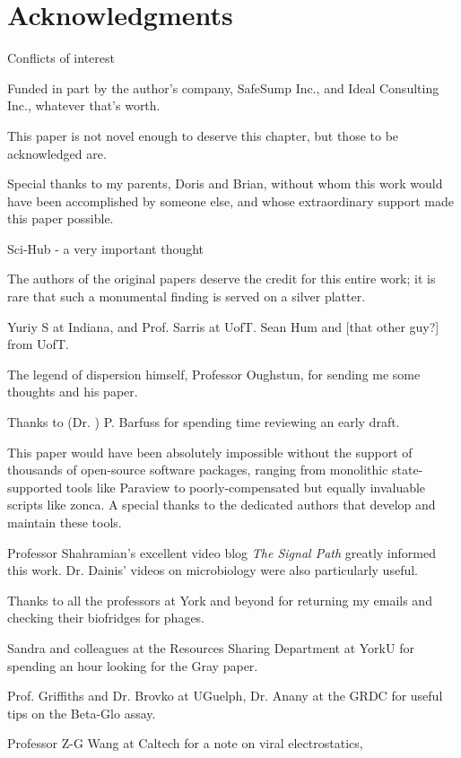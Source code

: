 \documentclass[paper.tex]{subfiles}
\begin{document}
	
\clearpage
\section{Acknowledgments}

Conflicts of interest

Funded in part by the author's company, SafeSump Inc., and Ideal Consulting Inc., whatever that's worth.

This paper is not novel enough to deserve this chapter, but those to be acknowledged are.

Special thanks to my parents, Doris and Brian, without whom this work would have been accomplished by someone else, and whose extraordinary support made this paper possible.

Sci-Hub - a very important thought

The authors of the original papers deserve the credit for this entire work; it is rare that such a monumental finding is served on a silver platter.

Yuriy S at Indiana, and Prof. Sarris at UofT. Sean Hum and [that other guy?] from UofT.

The legend of dispersion himself, Professor Oughstun, for sending me some thoughts and his paper.

Thanks to (Dr. ) P. Barfuss for spending time reviewing an early draft.

This paper would have been absolutely impossible without the support of thousands of open-source software packages, ranging from monolithic state-supported tools like Paraview to poorly-compensated but equally invaluable scripts like zonca. A special thanks to the dedicated authors that develop and maintain these tools.

Professor Shahramian's excellent video blog {\it The Signal Path} greatly informed this work. Dr. Dainis' videos on microbiology were also particularly useful.

Thanks to all the professors at York and beyond for returning my emails and checking their biofridges for phages.

Sandra and colleagues at the Resources Sharing Department at YorkU for spending an hour looking for 
the Gray paper.

Prof. Griffiths and Dr. Brovko at UGuelph, Dr. Anany at the GRDC for useful tips on the Beta-Glo assay.

Professor Z-G Wang at Caltech for a note on viral electrostatics, 
\end{document}
